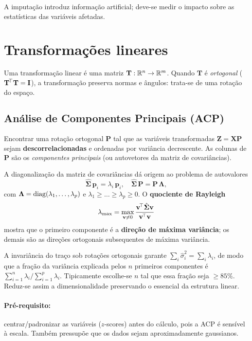 A imputação introduz informação artificial; deve-se medir o impacto
sobre as estatísticas das variáveis afetadas.

\section{Transformações lineares}

Uma transformação linear é uma matriz $\mathbf{T}:\mathbb{R}^n\to\mathbb{R}^m$. Quando
$\mathbf{T}$ é \emph{ortogonal} ($\mathbf{T}^{\!\top}\mathbf{T}=\mathbf{I}$),
a transformação preserva normas e ângulos: trata-se de uma rotação do
espaço.

\subsection{Análise de Componentes Principais (ACP)}

\begin{conceito}
Encontrar uma rotação ortogonal $\mathbf{P}$ tal que as variáveis
transformadas $\mathbf{Z}=\mathbf{X}\mathbf{P}$ sejam
\textbf{descorrelacionadas} e ordenadas por variância decrescente. As
colunas de $\mathbf{P}$ são os \emph{componentes principais} (ou
autovetores da matriz de covariâncias).
\end{conceito}

A diagonalização da matriz de covariâncias dá origem ao problema de
autovalores
\[
\hat{\boldsymbol{\Sigma}}\,\mathbf{p}_i = \lambda_i\,\mathbf{p}_i,
\quad
\hat{\boldsymbol{\Sigma}}\,\mathbf{P} = \mathbf{P}\,\boldsymbol\Lambda,
\]
com $\boldsymbol\Lambda=\operatorname{diag}(\lambda_1,\dots,\lambda_p)$ e
$\lambda_1\geq\dots\geq\lambda_p\geq 0$. O \textbf{quociente de
Rayleigh}
\[
\lambda_{\max}=\max_{\mathbf{v}\neq 0}\frac{\mathbf{v}^{\!\top}\hat{\boldsymbol{\Sigma}}\mathbf{v}}
                                            {\mathbf{v}^{\!\top}\mathbf{v}}
\]
mostra que o primeiro componente é a \textbf{direção de máxima
variância}; os demais são as direções ortogonais subsequentes de
máxima variância.

A invariância do traço sob rotações ortogonais garante
$\sum_i \hat{\sigma}_i^2 = \sum_i \lambda_i$, de modo que a fração da
variância explicada pelos $n$ primeiros componentes é
$\sum_{i=1}^n \lambda_i/\sum_{i=1}^p \lambda_i$. Tipicamente escolhe-se
$n$ tal que essa fração seja $\geq 85\%$. Reduz-se assim a
dimensionalidade preservando o essencial da estrutura linear.

\paragraph{Pré-requisito:} centrar/padronizar as variáveis ($z$-scores)
antes do cálculo, pois a ACP é sensível à escala. Também pressupõe que
os dados sejam aproximadamente gaussianos.

